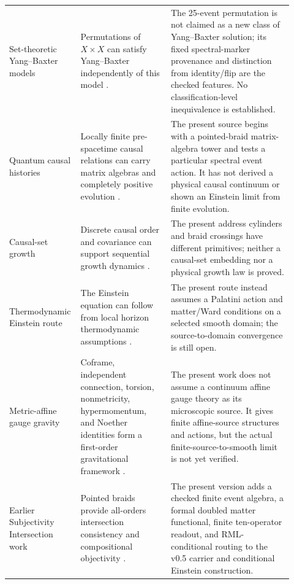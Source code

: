 \documentclass[11pt]{article}
\theoremstyle{definition}
\theoremstyle{remark}
\begin{document}
{\begin{longtable}{>{\raggedright\arraybackslash}p{0.19\linewidth}>{\raggedright\arraybackslash}p{0.31\linewidth}>{\raggedright\arraybackslash}p{0.42\linewidth}}
Set-theoretic Yang--Baxter models & Permutations of $X\times X$ can satisfy Yang--Baxter independently of this model \cite{etingof1998}. & The 25-event permutation is not claimed as a new class of Yang--Baxter solution; its fixed spectral-marker provenance and distinction from identity/flip are the checked features. No classification-level inequivalence is established. \\
Quantum causal histories & Locally finite pre-spacetime causal relations can carry matrix algebras and completely positive evolution \cite{hawkins2003}. & The present source begins with a pointed-braid matrix-algebra tower and tests a particular spectral event action. It has not derived a physical causal continuum or shown an Einstein limit from finite evolution. \\
Causal-set growth & Discrete causal order and covariance can support sequential growth dynamics \cite{rideout1999}. & The present address cylinders and braid crossings have different primitives; neither a causal-set embedding nor a physical growth law is proved. \\
Thermodynamic Einstein route & The Einstein equation can follow from local horizon thermodynamic assumptions \cite{jacobson1995}. & The present route instead assumes a Palatini action and matter/Ward conditions on a selected smooth domain; the source-to-domain convergence is still open. \\
Metric-affine gauge gravity & Coframe, independent connection, torsion, nonmetricity, hypermomentum, and Noether identities form a first-order gravitational framework \cite{hehl1995}. & The present work does not assume a continuum affine gauge theory as its microscopic source. It gives finite affine-source structures and actions, but the actual finite-source-to-smooth limit is not yet verified. \\
Earlier Subjectivity Intersection work & Pointed braids provide all-orders intersection consistency and compositional objectivity \cite{watanabe2026braid}. & The present version adds a checked finite event algebra, a formal doubled matter functional, finite ten-operator readout, and RML-conditional routing to the v0.5 carrier and conditional Einstein construction. \\
\bottomrule
\end{longtable}
}
\end{document}
